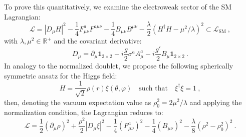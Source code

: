 \documentclass[a4paper,11pt]{article}
\begin{document}
To prove this quantitatively, we examine the electroweak sector of the SM Lagrangian:
\begin{equation}
    \mathcal{L} = |D_\mu H|^2 - \frac{1}{4} F_{\mu\nu}^a F^{a\mu\nu} - \frac{1}{4} B_{\mu\nu} B^{\mu\nu} - \frac{\lambda}{2} (H^\dagger H - \mu^2/\lambda)^2 \subset \mathcal{L}_{\text{SM}}\ ,
\end{equation}
with $\lambda, \mu^2 \in \mathbb{R}^+$ and the covariant derivative:
\begin{equation}
    D_\mu = \partial_\mu \mathbf 1_{2\times 2} - i \frac{g}{2} \sigma^a A_\mu^a - i \frac{g'}{2} B_\mu \mathbf{1}_{2\times 2}\ .
\end{equation}
In analogy to the normalized doublet, we propose the following spherically symmetric ansatz for the Higgs field:
\begin{equation}
    H = \frac{1}{\sqrt{2}} \rho(r) \xi(\theta, \varphi) \quad \text{such that} \quad \xi^\dagger \xi = 1\ ,
\end{equation}
then, denoting the vacuum expectation value as $\rho_0^2 = 2\mu^2/\lambda$ and applying the normalization condition, the Lagrangian reduces to:
\begin{equation}
    \mathcal{L} = \frac{1}{2}(\partial_\mu \rho)^2 + \frac{\rho^2}{2} |D_\mu \xi|^2 - \frac{1}{4}(F_{\mu\nu}^a)^2 - \frac{1}{4}(B_{\mu\nu})^2 - \frac{\lambda}{8}(\rho^2 - \rho_0^2)^2\ .
\end{equation}
\end{document}

